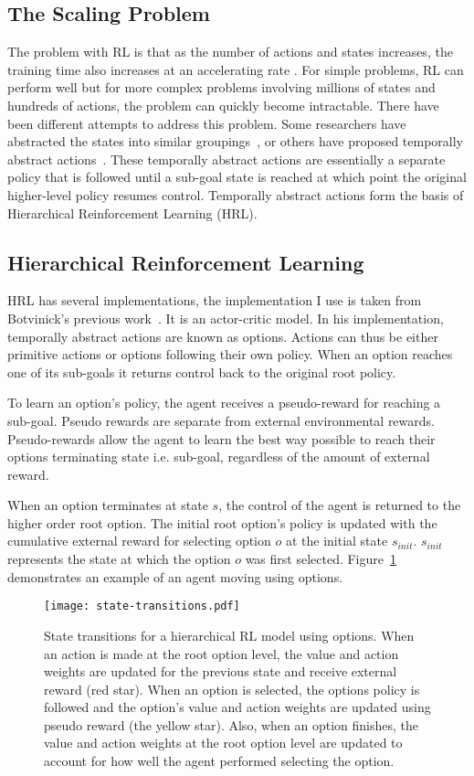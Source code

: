 \subsection{The Scaling Problem}
The problem with RL is that as the number of actions and states increases, the training time also increases at an accelerating rate \cite{botvinick2009hierarchically}. For simple problems, RL can perform well but for more complex problems involving millions of states and hundreds of actions, the problem can quickly become intractable. There have been different attempts to address this problem. Some researchers have abstracted the states into similar groupings~\cite{li2006towards}, or others have proposed temporally abstract actions~\cite{sutton1999between}. These temporally abstract actions are essentially a separate policy that is followed until a sub-goal state is reached at which point the original higher-level policy resumes control. Temporally abstract actions form the basis of Hierarchical Reinforcement Learning (HRL).

\subsection{Hierarchical Reinforcement Learning}
HRL has several implementations, the implementation I use is taken from Botvinick's previous work~\cite{botvinick2009hierarchically}. It is an actor-critic model. In his implementation, temporally abstract actions are known as options. Actions can thus be either primitive actions or options following their own policy. When an option reaches one of its sub-goals it returns control back to the original root policy. 

To learn an option's policy, the agent receives a pseudo-reward for reaching a sub-goal. Pseudo rewards are separate from external environmental rewards. Pseudo-rewards allow the agent to learn the best way possible to reach their options terminating state i.e. sub-goal, regardless of the amount of external reward.

When an option terminates at state $s$, the control of the agent is returned to the higher order root option. The initial root option's policy is updated with the cumulative external reward for selecting option $o$ at the initial state $s_{init}$. $s_{init}$ represents the state at which the option $o$ was first selected. Figure~\ref{fig:state-transitions} demonstrates an example of an agent moving using options.

\begin{figure}[h]
\centering
\texttt{[image: state-transitions.pdf]}
\caption{State transitions for a hierarchical RL model using options. When an action is made at the root option level, the value and action weights are updated for the previous state and receive external reward (red star). When an option is selected, the options policy is followed and the option's value and action weights are updated using pseudo reward (the yellow star). Also, when an option finishes, the value and action weights at the root option level are updated to account for how well the agent performed selecting the option.}
\label{fig:state-transitions}
\end{figure}

